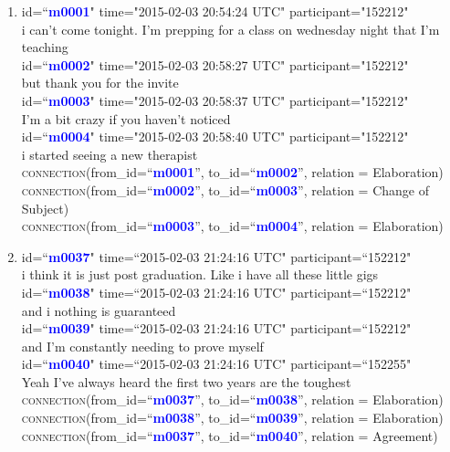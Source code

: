 \documentclass{article}
\begin{document}
\begin{enumerate}[resume]
\item id=``\textbf{\textcolor{blue}{m0001}}" time="2015-02-03 20:54:24 UTC" participant="152212"\\
i can't come tonight. I'm prepping for a class on wednesday night that I'm teaching\\
id=``\textbf{\textcolor{blue}{m0002}}" time="2015-02-03 20:58:27 UTC" participant="152212"\\
but thank you for the invite\\
id=``\textbf{\textcolor{blue}{m0003}}" time="2015-02-03 20:58:37 UTC" participant="152212"\\
I'm a bit crazy if you haven't noticed\\
id=``\textbf{\textcolor{blue}{m0004}}" time="2015-02-03 20:58:40 UTC" participant="152212"\\
i started seeing a new therapist\\
\textsc{connection}(from\_id=``\textbf{\textcolor{blue}{m0001}}'', to\_id=``\textbf{\textcolor{blue}{m0002}}'', relation = Elaboration)\\
\textsc{connection}(from\_id=``\textbf{\textcolor{blue}{m0002}}'', to\_id=``\textbf{\textcolor{blue}{m0003}}'', relation = Change of Subject)\\
\textsc{connection}(from\_id=``\textbf{\textcolor{blue}{m0003}}'', to\_id=``\textbf{\textcolor{blue}{m0004}}'', relation = Elaboration)
\item id=``\textbf{\textcolor{blue}{m0037}}" time=``2015-02-03 21:24:16 UTC" participant=``152212" \\
i think it is just post graduation. Like i have all these little gigs \\
id=``\textbf{\textcolor{blue}{m0038}}" time=``2015-02-03 21:24:16 UTC" participant=``152212" \\
and i nothing is guaranteed \\
id=``\textbf{\textcolor{blue}{m0039}}" time=``2015-02-03 21:24:16 UTC" participant=``152212" \\
and I'm constantly needing to prove myself \\
id=``\textbf{\textcolor{blue}{m0040}}" time=``2015-02-03 21:24:16 UTC" participant=``152255" \\
Yeah I've always heard the first two years are the toughest \\
\textsc{connection}(from\_id=``\textbf{\textcolor{blue}{m0037}}'', to\_id=``\textbf{\textcolor{blue}{m0038}}'', relation = Elaboration)\\
\textsc{connection}(from\_id=``\textbf{\textcolor{blue}{m0038}}'', to\_id=``\textbf{\textcolor{blue}{m0039}}'', relation = Elaboration)\\
\textsc{connection}(from\_id=``\textbf{\textcolor{blue}{m0037}}'', to\_id=``\textbf{\textcolor{blue}{m0040}}'', relation = Agreement)
\end{enumerate}
\end{document}
